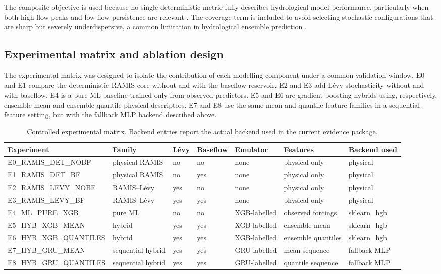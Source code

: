 The composite objective is used because no single deterministic metric
fully describes hydrological model performance, particularly when both
high-flow peaks and low-flow persistence are relevant
\citep{pushpalatha2012review}. The coverage term is included to avoid
selecting stochastic configurations that are sharp but severely
underdispersive, a common limitation in hydrological ensemble
prediction \citep{franz2011evaluating,abaza2017incidence}.

\subsection{Experimental matrix and ablation design}\label{subsec:matrix}

The experimental matrix was designed to isolate the contribution of each
modelling component under a common validation window. E0 and E1 compare
the deterministic RAMIS core without and with the baseflow reservoir.
E2 and E3 add L\'{e}vy stochasticity without and with baseflow. E4 is a
pure ML baseline trained only from observed predictors. E5 and E6 are
gradient-boosting hybrids using, respectively, ensemble-mean and
ensemble-quantile physical descriptors. E7 and E8 use the same mean and
quantile feature families in a sequential-feature setting, but with the
fallback MLP backend described above.

\begin{table}[t]
\caption{Controlled experimental matrix. Backend entries report the
actual backend used in the current evidence package.}
\label{tab:experiment-matrix}
\centering
\small
\begin{tabular*}{\textwidth}{@{\extracolsep{\fill}}lllllll@{}}
\toprule
Experiment & Family & L\'{e}vy & Baseflow & Emulator & Features
  & Backend used \\
\midrule
E0\_RAMIS\_DET\_NOBF   & physical RAMIS & no  & no  & none
  & physical only & physical \\
E1\_RAMIS\_DET\_BF     & physical RAMIS & no  & yes & none
  & physical only & physical \\
E2\_RAMIS\_LEVY\_NOBF  & RAMIS--L\'{e}vy & yes & no  & none
  & physical only & physical \\
E3\_RAMIS\_LEVY\_BF    & RAMIS--L\'{e}vy & yes & yes & none
  & physical only & physical \\
E4\_ML\_PURE\_XGB      & pure ML        & no  & no  & XGB-labelled
  & observed forcings & sklearn\_hgb \\
E5\_HYB\_XGB\_MEAN     & hybrid         & yes & yes & XGB-labelled
  & ensemble mean & sklearn\_hgb \\
E6\_HYB\_XGB\_QUANTILES & hybrid        & yes & yes & XGB-labelled
  & ensemble quantiles & sklearn\_hgb \\
E7\_HYB\_GRU\_MEAN     & sequential hybrid & yes & yes & GRU-labelled
  & mean sequence & fallback MLP \\
E8\_HYB\_GRU\_QUANTILES & sequential hybrid & yes & yes & GRU-labelled
  & quantile sequence & fallback MLP \\
\bottomrule
\end{tabular*}
\end{table}

